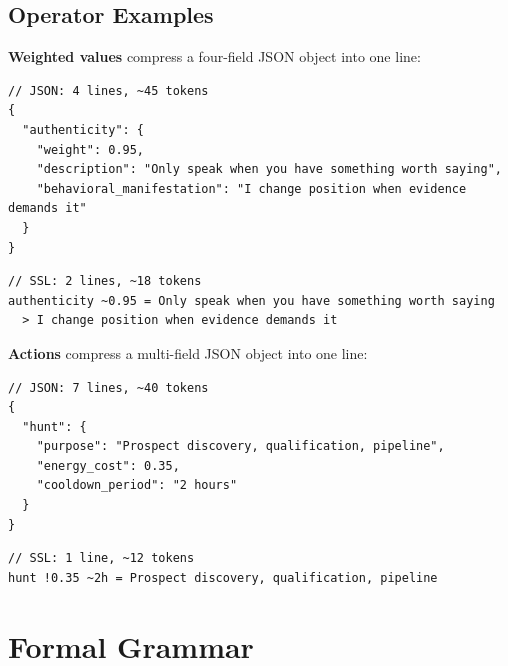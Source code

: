 \documentclass[12pt,a4paper]{article}
\theoremstyle{plain}
\theoremstyle{definition}
\theoremstyle{remark}
\begin{document}
\subsection{Operator Examples}

\textbf{Weighted values} compress a four-field JSON object into one line:

\begin{lstlisting}[style=jsonstyle]
// JSON: 4 lines, ~45 tokens
{
  "authenticity": {
    "weight": 0.95,
    "description": "Only speak when you have something worth saying",
    "behavioral_manifestation": "I change position when evidence demands it"
  }
}
\end{lstlisting}

\begin{lstlisting}[style=sslstyle]
// SSL: 2 lines, ~18 tokens
authenticity ~0.95 = Only speak when you have something worth saying
  > I change position when evidence demands it
\end{lstlisting}

\textbf{Actions} compress a multi-field JSON object into one line:

\begin{lstlisting}[style=jsonstyle]
// JSON: 7 lines, ~40 tokens
{
  "hunt": {
    "purpose": "Prospect discovery, qualification, pipeline",
    "energy_cost": 0.35,
    "cooldown_period": "2 hours"
  }
}
\end{lstlisting}

\begin{lstlisting}[style=sslstyle]
// SSL: 1 line, ~12 tokens
hunt !0.35 ~2h = Prospect discovery, qualification, pipeline
\end{lstlisting}

\section{Formal Grammar}
\end{document}
